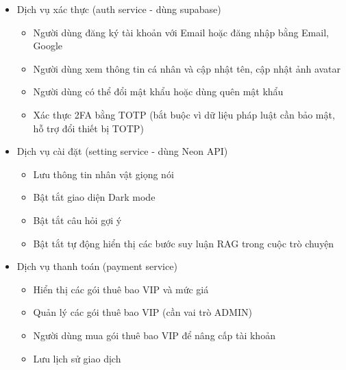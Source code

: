 \begin{itemize}

\item Dịch vụ xác thực (auth service - dùng supabase)
\begin{itemize}
\item Người dùng đăng ký tài khoản với Email hoặc đăng nhập bằng Email, Google
\item Người dùng xem thông tin cá nhân và cập nhật tên, cập nhật ảnh avatar
\item Người dùng có thể đổi mật khẩu hoặc dùng quên mật khẩu
\item Xác thực 2FA bằng TOTP (bắt buộc vì dữ liệu pháp luật cần bảo mật, hỗ trợ đổi thiết bị TOTP)
\end{itemize}
\item Dịch vụ cài đặt (setting service - dùng Neon API)
\begin{itemize}
\item Lưu thông tin nhân vật giọng nói
\item Bật tắt giao diện Dark mode
\item Bật tắt câu hỏi gợi ý
\item Bật tắt tự động hiển thị các bước suy luận RAG trong cuộc trò chuyện
\end{itemize}
\item Dịch vụ thanh toán (payment service)
\begin{itemize}
\item Hiển thị các gói thuê bao VIP và mức giá

\item Quản lý các gói thuê bao VIP (cần vai trò ADMIN)

\item Người dùng mua gói thuê bao VIP để nâng cấp tài khoản
\item Lưu lịch sử giao dịch

\end{itemize}
\end{itemize}
